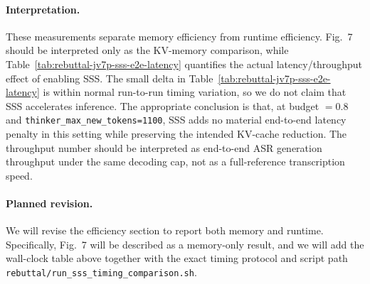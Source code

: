 \begin{answer}
    \paragraph{Interpretation.}
    These measurements separate memory efficiency from runtime efficiency.
    Fig.~7 should be interpreted only as the KV-memory comparison, while Table~\ref{tab:rebuttal-jv7p-sss-e2e-latency} quantifies the actual latency/throughput effect of enabling SSS.
    The small delta in Table~\ref{tab:rebuttal-jv7p-sss-e2e-latency} is within normal run-to-run timing variation, so we do not claim that SSS accelerates inference.
    The appropriate conclusion is that, at budget $=0.8$ and \texttt{thinker\_max\_new\_tokens=1100}, SSS adds no material end-to-end latency penalty in this setting while preserving the intended KV-cache reduction.
    The throughput number should be interpreted as end-to-end ASR generation throughput under the same decoding cap, not as a full-reference transcription speed.

    \paragraph{Planned revision.}
    We will revise the efficiency section to report both memory and runtime.
    Specifically, Fig.~7 will be described as a memory-only result, and we will add the wall-clock table above together with the exact timing protocol and script path \texttt{rebuttal/run\_sss\_timing\_comparison.sh}.
\end{answer}

